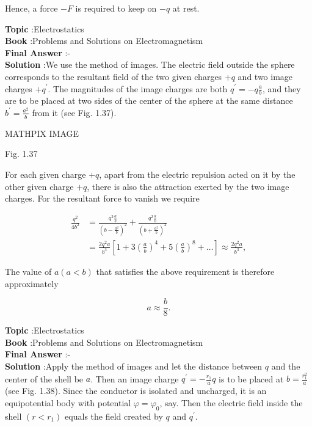 \documentclass[10pt]{article}
\begin{document}
Hence, a force $-F$ is required to keep on $-q$ at rest.

\textbf{Topic} :Electrostatics\\
\textbf{Book} :Problems and Solutions on Electromagnetism\\
\textbf{Final Answer} :-\\


\textbf{Solution} :We use the method of images. The electric field outside the sphere corresponds to the resultant field of the two given charges $+q$ and two image charges $+q^{\prime}$. The magnitudes of the image charges are both $q^{\prime}=-q \frac{a}{b}$, and they are to be placed at two sides of the center of the sphere at the same distance $b^{\prime}=\frac{a^{2}}{b}$ from it (see Fig. 1.37). 

MATHPIX IMAGE

Fig. 1.37

For each given charge $+q$, apart from the electric repulsion acted on it by the other given charge $+q$, there is also the attraction exerted by the two image charges. For the resultant force to vanish we require

$$
\begin{aligned}
\frac{q^{2}}{4 b^{2}} &=\frac{q^{2} \frac{a}{b}}{\left(b-\frac{a^{2}}{b}\right)^{2}}+\frac{q^{2} \frac{a}{b}}{\left(b+\frac{a^{2}}{b}\right)^{2}} \\
&=\frac{2 q^{2} a}{b^{3}}\left[1+3\left(\frac{a}{b}\right)^{4}+5\left(\frac{a}{b}\right)^{8}+\ldots\right] \approx \frac{2 q^{2} a}{b^{3}},
\end{aligned}
$$

The value of $a(a<b)$ that satisfies the above requirement is therefore approximately

$$
a \approx \frac{b}{8} .
$$

\textbf{Topic} :Electrostatics\\
\textbf{Book} :Problems and Solutions on Electromagnetism\\
\textbf{Final Answer} :-\\


\textbf{Solution} :Apply the method of images and let the distance between $q$ and the center of the shell be $a$. Then an image charge $q^{\prime}=-\frac{r_{1}}{a} q$ is to be placed at $b=\frac{r_{1}^{2}}{a}$ (see Fig. 1.38). Since the conductor is isolated and uncharged, it is an equipotential body with potential $\varphi=\varphi_{0}$, say. Then the electric field inside the shell $\left(r<r_{1}\right)$ equals the field created by $q$ and $q^{\prime}$.
\end{document}
